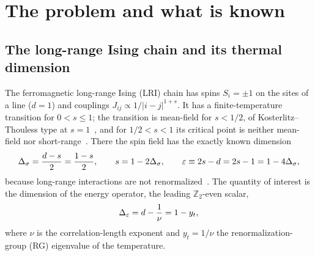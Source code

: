 \section{The problem and what is known}\label{nrg:sec:model}
\subsection{The long-range Ising chain and its thermal dimension}
The ferromagnetic long-range Ising (LRI) chain has spins $S_i=\pm1$ on the sites of a line ($d=1$) and couplings
$J_{ij}\propto1/|i-j|^{1+s}$. It has a finite-temperature transition for $0<s\le1$; the transition is mean-field for $s<1/2$, of
Kosterlitz--Thouless type at $s=1$~\cite{nrg:Kosterlitz1976,nrg:LM01}, and for $1/2<s<1$ its critical point is neither mean-field nor
short-range~\cite{nrg:Fisher1972,nrg:Sak1973}. There the spin field has the exactly known dimension
\begin{equation}
\Delta_\sigma=\frac{d-s}{2}=\frac{1-s}{2},\qquad s=1-2\Delta_\sigma,\qquad \varepsilon\equiv2s-d=2s-1=1-4\Delta_\sigma ,\label{nrg:eq:ds}
\end{equation}
because long-range interactions are not renormalized~\cite{nrg:Sak1973}. The quantity of interest is the dimension of the energy
operator, the leading $\mathbb Z_2$-even scalar,
\begin{equation}
\Delta_\varepsilon=d-\frac1\nu=1-y_t ,\label{nrg:eq:De}
\end{equation}
where $\nu$ is the correlation-length exponent and $y_t=1/\nu$ the renormalization-group (RG) eigenvalue of the temperature.

